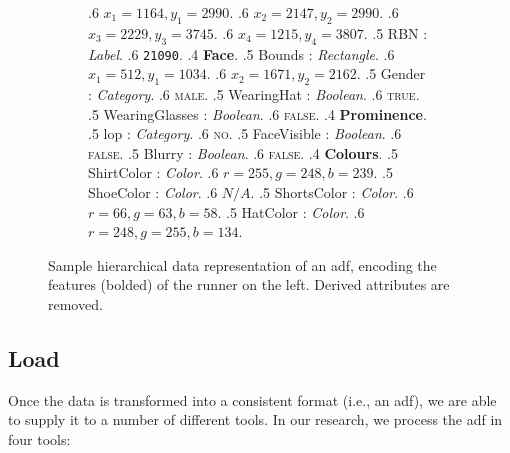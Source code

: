 \begin{figure}
\begin{subfigure}[b]{0.50\textwidth}
{      .6 $x_{1} = 1164, y_{1} = 2990$.
      .6 $x_{2} = 2147, y_{2} = 2990$.
      .6 $x_{3} = 2229, y_{3} = 3745$.
      .6 $x_{4} = 1215, y_{4} = 3807$.
      .5 RBN : \textit{Label}. 
      .6 \texttt{21090}.
      .4 \textbf{Face}.
      .5 Bounds : \textit{Rectangle}.    
      .6 $x_{1} = 512, y_{1} = 1034$.
      .6 $x_{2} = 1671, y_{2} = 2162$.
      .5 Gender : \textit{Category}.
      .6 \textsc{male}.
      .5 WearingHat : \textit{Boolean}.
      .6 \textsc{true}.
      .5 WearingGlasses : \textit{Boolean}.
      .6 \textsc{false}.
      .4 \textbf{Prominence}.
      .5 \gls{lop} : \textit{Category}.
      .6 \textsc{no}.
      .5 FaceVisible : \textit{Boolean}.
      .6 \textsc{false}.
      .5 Blurry : \textit{Boolean}.
      .6 \textsc{false}.
      .4 \textbf{Colours}.
      .5 ShirtColor : \textit{Color}.
      .6 $r = 255, g = 248, b = 239$.
      .5 ShoeColor : \textit{Color}.
      .6 $N/A$.
      .5 ShortsColor : \textit{Color}.
      .6 $r = 66, g = 63, b = 58$.
      .5 HatColor : \textit{Color}.
      .6 $r = 248, g = 255, b = 134$.
    }  
  \end{subfigure}
  \caption[Sample representation of an ADF]{Sample hierarchical data representation of an \gls{adf}, encoding the features (bolded) of the runner on the left. Derived attributes are removed.}
  \label{fig:dataset:adf_representation}
\end{figure}

\subsection{Load}
\label{sec:dataset:process:load}

Once the data is transformed into a consistent format (i.e., an \gls{adf}), we are able to supply it to a number of different tools. In our research, we process the \gls{adf} in four tools:

